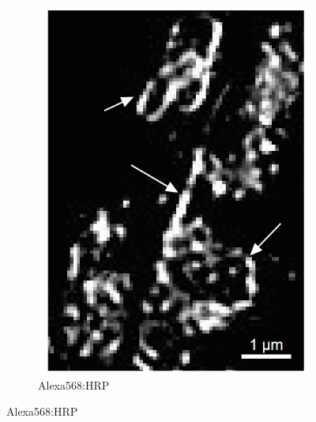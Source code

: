 \begin{figure}
\begin{subfigure}[t]{0.242\textwidth}
		\includegraphics[width=\linewidth]{images/DeepSIM_NMJ_AO_ROI1_Alexa568.jpg}
		\caption{Alexa568:HRP}
		\label{fig:DeepSIM_NMJ_AO_ROI1_Alexa568}
	\end{subfigure}
	

\end{figure}

